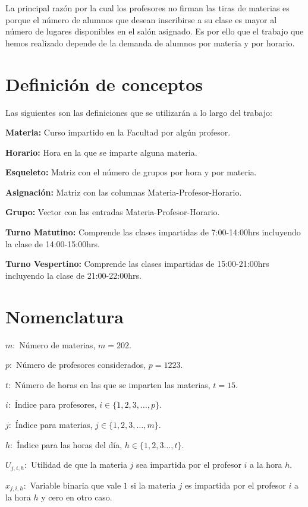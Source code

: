 La principal razón por la cual los profesores no firman las tiras de materias es porque el número de alumnos que desean inscribirse a su clase es mayor al número de lugares disponibles en el salón asignado. Es por ello que el trabajo que hemos realizado depende de la demanda de alumnos por materia y por horario.



\section{Definición de conceptos}

Las siguientes son las definiciones que se utilizarán a lo largo del trabajo:
  
\textbf{Materia:} Curso impartido en la Facultad por algún profesor.

\textbf{Horario:} Hora en la que se imparte alguna materia.

\textbf{Esqueleto:} Matriz con el número de grupos por hora y por materia.

\textbf{Asignación:} Matriz con las columnas Materia-Profesor-Horario.

\textbf{Grupo:} Vector con las entradas Materia-Profesor-Horario.

\textbf{Turno Matutino:} Comprende las clases impartidas de 7:00-14:00hrs incluyendo la clase de 14:00-15:00hrs.

\textbf{Turno Vespertino:} Comprende las clases impartidas de 15:00-21:00hrs incluyendo la clase de 21:00-22:00hrs.


\section{Nomenclatura}

$m:$ Número de materias, $m = 202$.
  
  $p:$ Número de profesores considerados, $p = 1223$.
  
  $t:$ Número de horas en las que se imparten las materias, $t = 15$.
  
  $i:$ Índice para profesores, $i \in \{ 1, 2, 3, \ldots, p \}$.
  
  $j:$ Índice para materias, $j \in \{ 1, 2, 3, \ldots, m \}$.
  
  $h:$ Índice para las horas del día, $h \in \{ 1, 2, 3 \ldots, t\}$.
  
  $U_{j,i,h}:$ Utilidad de que la materia $j$ sea impartida por  el profesor $i$ a la hora $h$.
  
  $x_{j,i,h}:$ Variable binaria que vale $1$ si la materia $j$ es impartida por el profesor $i$ a la hora $h$ y cero en otro caso.

